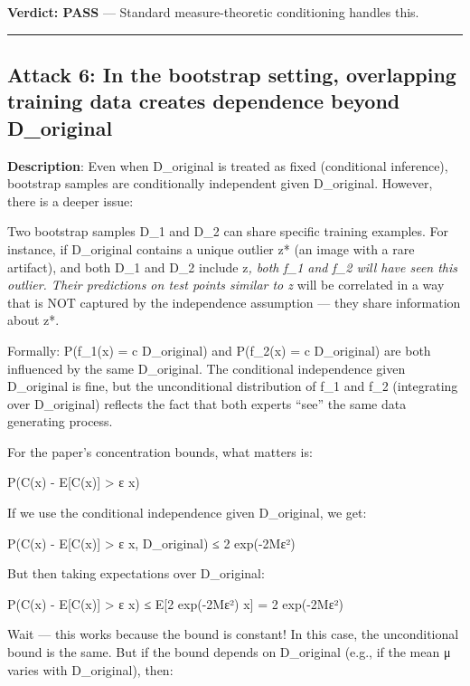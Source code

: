 \documentclass[
  12pt,
]{ctexart}
\begin{document}
\textbf{Verdict: PASS} --- Standard measure-theoretic conditioning
handles this.

\begin{center}\rule{0.5\linewidth}{0.5pt}\end{center}

\subsection{Attack 6: In the bootstrap setting, overlapping training
data creates dependence beyond
D\_original}\label{attack-6-in-the-bootstrap-setting-overlapping-training-data-creates-dependence-beyond-d_original}

\textbf{Description}: Even when D\_original is treated as fixed
(conditional inference), bootstrap samples are conditionally independent
given D\_original. However, there is a deeper issue:

Two bootstrap samples D\_1 and D\_2 can share specific training
examples. For instance, if D\_original contains a unique outlier z* (an
image with a rare artifact), and both D\_1 and D\_2 include z\emph{,
both f\_1 and f\_2 will have seen this outlier. Their predictions on
test points similar to z} will be correlated in a way that is NOT
captured by the independence assumption --- they share information about
z*.

Formally: P(f\_1(x) = c \textbar{} D\_original) and P(f\_2(x) = c
\textbar{} D\_original) are both influenced by the same D\_original. The
conditional independence given D\_original is fine, but the
unconditional distribution of f\_1 and f\_2 (integrating over
D\_original) reflects the fact that both experts ``see'' the same data
generating process.

For the paper's concentration bounds, what matters is:

P(\textbar C(x) - E{[}C(x){]}\textbar{} \textgreater{} ε \textbar{} x)

If we use the conditional independence given D\_original, we get:

P(\textbar C(x) - E{[}C(x){]}\textbar{} \textgreater{} ε \textbar{} x,
D\_original) ≤ 2 exp(-2Mε²)

But then taking expectations over D\_original:

P(\textbar C(x) - E{[}C(x){]}\textbar{} \textgreater{} ε \textbar{} x) ≤
E{[}2 exp(-2Mε²) \textbar{} x{]} = 2 exp(-2Mε²)

Wait --- this works because the bound is constant! In this case, the
unconditional bound is the same. But if the bound depends on D\_original
(e.g., if the mean μ varies with D\_original), then:
\end{document}
